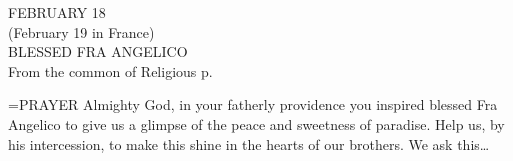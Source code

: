 \begin{center}\normalsize FEBRUARY 18\\
\footnotesize (February 19 in France)\\
\footnotesize BLESSED FRA ANGELICO\\
\footnotesize From the common of Religious p. \\
\end{center}

\hangindent=\parindent \small{PRAYER 
Almighty God, in your fatherly providence you inspired
blessed Fra Angelico to give us a glimpse of the peace and sweetness
of paradise. Help us, by his intercession, to make this shine in the
hearts of our brothers. We ask this…\\}
 
